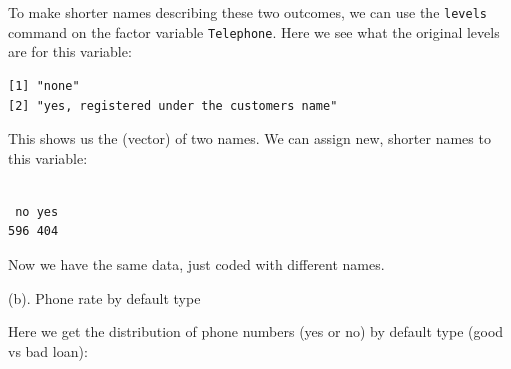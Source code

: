 \documentclass[
]{book}
\newenvironment{Shaded}{\begin{snugshade}}{\end{snugshade}}
\newcommand{\DecValTok}[1]{\textcolor[rgb]{0.00,0.00,0.81}{#1}}
\newcommand{\FunctionTok}[1]{\textcolor[rgb]{0.00,0.00,0.00}{#1}}
\newcommand{\NormalTok}[1]{#1}
\newcommand{\OtherTok}[1]{\textcolor[rgb]{0.56,0.35,0.01}{#1}}
\newcommand{\SpecialCharTok}[1]{\textcolor[rgb]{0.00,0.00,0.00}{#1}}
\newcommand{\StringTok}[1]{\textcolor[rgb]{0.31,0.60,0.02}{#1}}
\begin{document}
To make shorter names describing these two outcomes, we can use the \texttt{levels} command on the factor variable \texttt{Telephone}. Here we see what the original levels are for this variable:

\begin{Shaded}
\end{Shaded}

\begin{verbatim}
[1] "none"                                    
[2] "yes, registered under the customers name"
\end{verbatim}

This shows us the (vector) of two names. We can assign new, shorter names to this variable:

\begin{Shaded}
\end{Shaded}

\begin{verbatim}

 no yes 
596 404 
\end{verbatim}

Now we have the same data, just coded with different names.

(b). Phone rate by default type

Here we get the distribution of phone numbers (yes or no) by default type (good vs bad loan):

\begin{Shaded}
\end{Shaded}
\end{document}
